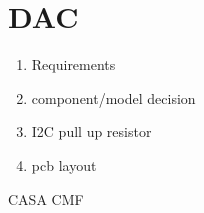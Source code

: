 \section{DAC}

\begin{enumerate}
  \item Requirements
  \item component/model decision
  \item I2C
  \subitem pull up resistor
  \item pcb layout
\end{enumerate}

\Gls{CASA}
\Gls{CMF}